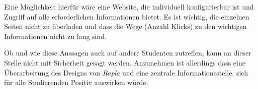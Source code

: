 Eine Möglichkeit hierfür wäre eine Website, die individuell konfigurierbar ist und Zugriff auf alle erforderlichen Informationen bietet. Es ist wichtig, die einzelnen Seiten nicht zu überladen und dass die Wege (Anzahl Klicks) zu den wichtigen Informationen nicht zu lang sind.

Ob und wie diese Aussagen auch auf andere Studenten zutreffen, kann an dieser Stelle nicht mit Sicherheit gesagt werden. Anzunehmen ist allerdings dass eine Überarbeitung des Designs von \emph{Rapla} und eine zentrale Informationsstelle, sich für alle Studierenden Positiv auswirken würde.
